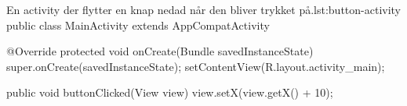 \clearpage

\begin{JavaCode}{En activity der flytter en knap nedad når den bliver trykket %
på.}{lst:button-activity}
	public class MainActivity extends AppCompatActivity {
		
		@Override
		protected void onCreate(Bundle savedInstanceState) {
			super.onCreate(savedInstanceState);
			setContentView(R.layout.activity_main);
		}
		
		
		public void buttonClicked(View view) {
			view.setX(view.getX() + 10);
		}
	}
\end{JavaCode}


